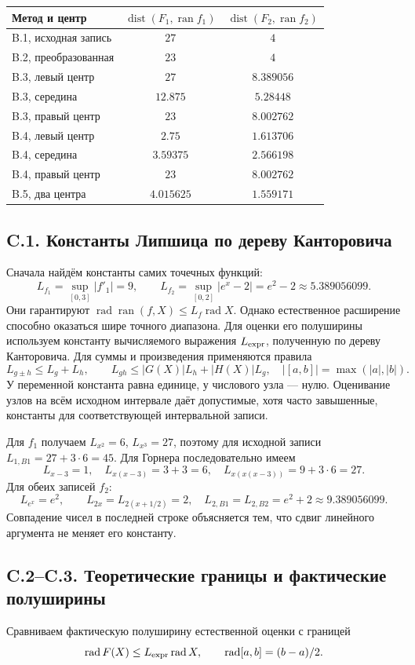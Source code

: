 \documentclass[12pt,a4paper]{article}
\newcommand{\ran}{\operatorname{ran}}
\newcommand{\rad}{\operatorname{rad}}
\newcommand{\dist}{\operatorname{dist}}
\begin{document}
\begin{center}
{\small
\begin{tabular}{lcc}
\toprule
Метод и центр & $\dist(F_1,\ran f_1)$ & $\dist(F_2,\ran f_2)$\\\midrule
B.1, исходная запись & $27$ & $4$\\
B.2, преобразованная & $23$ & $4$\\
B.3, левый центр & $27$ & $8.389056$\\
B.3, середина & $12.875$ & $5.28448$\\
B.3, правый центр & $23$ & $8.002762$\\
B.4, левый центр & $2.75$ & $1.613706$\\
B.4, середина & $3.59375$ & $2.566198$\\
B.4, правый центр & $23$ & $8.002762$\\
B.5, два центра & $4.015625$ & $1.559171$\\
\bottomrule
\end{tabular}}
\end{center}


\subsection*{C.1. Константы Липшица по дереву Канторовича}
Сначала найдём константы самих точечных функций:
\[
L_{f_1}=\sup_{[0,3]}|f'_1|=9,\qquad
L_{f_2}=\sup_{[0,2]}|e^x-2|=e^2-2\approx5.389056099.
\]
Они гарантируют $\rad\ran(f,X)\leq L_f\rad X$.
Однако естественное расширение способно оказаться шире точного
диапазона. Для оценки его полуширины используем константу
вычисляемого выражения $L_{\rm expr}$, полученную по дереву Канторовича.
Для суммы и произведения применяются правила
\[
L_{g\pm h}\leq L_g+L_h,\qquad
L_{gh}\leq |G(X)|L_h+|H(X)|L_g,
\quad |[a,b]|=\max(|a|,|b|).
\]
У переменной константа равна единице, у числового узла --- нулю.
Оценивание узлов на всём исходном интервале даёт допустимые, хотя
часто завышенные, константы для соответствующей интервальной записи.

Для $f_1$ получаем $L_{x^2}=6$, $L_{x^3}=27$,
поэтому для исходной записи $L_{1,B1}=27+3\cdot6=45$.
Для Горнера последовательно имеем
\[
L_{x-3}=1,\quad L_{x(x-3)}=3+3=6,\quad
L_{x(x(x-3))}=9+3\cdot6=27.
\]
Для обеих записей $f_2$:
\[
L_{e^x}=e^2,\qquad L_{2x}=L_{2(x+1/2)}=2,
\quad L_{2,B1}=L_{2,B2}=e^2+2\approx9.389056099.
\]
Совпадение чисел в последней строке объясняется тем, что сдвиг
линейного аргумента не меняет его константу.

\subsection*{C.2--C.3. Теоретические границы и фактические полуширины}
Сравниваем фактическую полуширину естественной оценки с границей
\begin{equation}\label{eq:lip}
\rad F(X)\leq L_{\rm expr}\rad X,\qquad
\rad[a,b]=(b-a)/2.
\end{equation}
\end{document}
